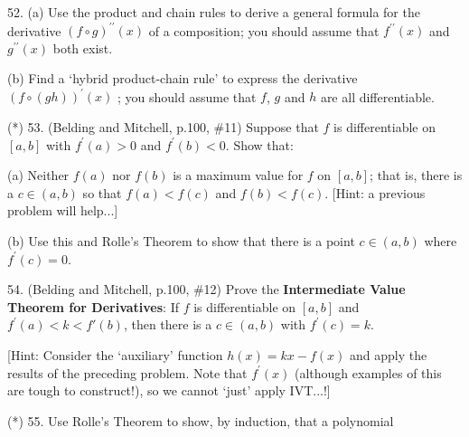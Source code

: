 \documentclass[12pt]{article}
\begin{document}
\begin{description}


\item{52.} (a) Use the product and chain rules to derive a general formula
for the  derivative $(f\circ g)^{\prime\prime}(x)$ of a composition; you should assume 
that $f^{\prime\prime}(x)$ and $g^{\prime\prime}(x)$ both exist.

\ssk

\item{\spc} (b) Find a `hybrid product-chain rule' to express the derivative
$(f\circ (gh))^\prime(x)$ ; you should assume that $f$, $g$ and $h$ are all 
differentiable.

\msk

\item{(*) 53.} (Belding and Mitchell, p.100, \#11) Suppose that $f$ is differentiable on $[a,b]$ with $f^\prime(a) > 0$ 
and $f^\prime(b) < 0$. Show that:

\ssk

\item{\spc} (a) Neither $f(a)$ nor $f(b)$ is a
maximum value for $f$ on $[a,b]$; that is, there is a $c\in (a,b)$ so that
$f(a)<f(c)$ and $f(b)<f(c)$.  [Hint: a previous problem will help...]

\ssk

\item{\spc} (b) Use this and Rolle's Theorem to show that there is a point $c\in (a,b)$ where $f^\prime(c) = 0$.

\msk

\item{54.} (Belding and Mitchell, p.100, \#12) Prove
the {\bf Intermediate Value Theorem for Derivatives}: If $f$ is differentiable
on $[a,b]$ and $f^\prime(a) < k < f\prime(b)$, then there is a $c\in (a,b)$ with $f^\prime(c) = k$.

\ssk

[Hint: Consider the `auxiliary' function $h(x) = kx-f(x)$
and apply the results of the preceding problem. Note that $f^\prime(x)$ 
    (although examples of this are 
tough to construct!), so we cannot `just' apply IVT...!]

\msk

\item{(*) 55.} Use Rolle's Theorem to show, by induction,
that a polynomial 

\ssk



\end{description}
\end{document}
